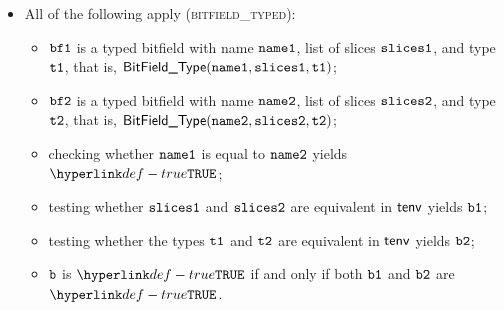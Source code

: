 \documentclass{book}
\newcommand\ProseOrTypeError[0]{\ProseTerminateAs{\TypeErrorConfig}}
\begin{document}
\begin{itemize}
  \item All of the following apply (\textsc{bitfield\_typed}):
  \begin{itemize}
    \item $\texttt{bf1}$ is a typed bitfield with name $\texttt{name1}$, list of slices $\texttt{slices1}$, and type $\texttt{t1}$, that is,
          $\textsf{BitField\_Type}(\texttt{name1}, \texttt{slices1}, \texttt{t1})$;
    \item $\texttt{bf2}$ is a typed bitfield with name $\texttt{name2}$, list of slices $\texttt{slices2}$, and type $\texttt{t2}$, that is,
          $\textsf{BitField\_Type}(\texttt{name2}, \texttt{slices2}, \texttt{t2})$;
    \item checking whether $\texttt{name1}$ is equal to $\texttt{name2}$ yields $\True$\ProseTerminateAs{\False};
    \item testing whether $\texttt{slices1}$ and $\texttt{slices2}$ are equivalent in $\textsf{tenv}$ yields $\texttt{b1}$\ProseOrTypeError;
    \item testing whether the types $\texttt{t1}$ and $\texttt{t2}$ are equivalent in $\textsf{tenv}$ yields $\texttt{b2}$\ProseOrTypeError;
    \item $\texttt{b}$ is $\True$ if and only if both $\texttt{b1}$ and $\texttt{b2}$ are $\True$.
  \end{itemize}
\end{itemize}
\end{document}
